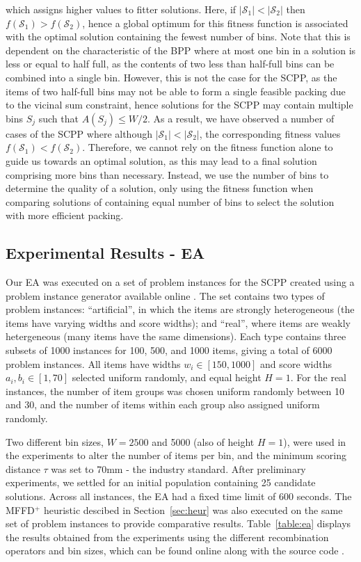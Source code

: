 \documentclass[authoryear]{elsarticle}
\begin{document}
\noindent which assigns higher values to fitter solutions. Here, if $|\mathcal{S}_1| < |\mathcal{S}_2|$  then $f(\mathcal{S}_1) > f(\mathcal{S}_2)$, hence a global optimum for this fitness function is associated with the optimal solution containing the fewest number of bins. Note that this is dependent on the characteristic of the BPP where at most one bin in a solution is less or equal to half full, as the contents of two less than half-full bins can be combined into a single bin. However, this is not the case for the SCPP, as the items of two half-full bins may not be able to form a single feasible packing due to the vicinal sum constraint, hence solutions for the SCPP may contain multiple bins $S_j$ such that $A(S_j) \leq W/2$. As a result, we have observed a number of cases of the SCPP where although  $|\mathcal{S}_1| < |\mathcal{S}_2|$, the corresponding fitness values $f(\mathcal{S}_1) < f(\mathcal{S}_2)$. Therefore, we cannot rely on the fitness function alone to guide us towards an optimal solution, as this may lead to a final solution comprising more bins than necessary. Instead, we use the number of bins to determine the quality of a solution, only using the fitness function when comparing solutions of containing equal number of bins to select the solution with more efficient packing.


\subsection{Experimental Results - EA}
\label{sub:expea}
\noindent Our EA was executed on a set of problem instances for the SCPP created using a problem instance generator available online \citep{hawa2019inst}. The set contains two types of problem instances: ``artificial'', in which the items are strongly heterogeneous (the items have varying widths and score widths); and ``real'', where items are weakly hetergeneous (many items have the same dimensions). Each type contains three subsets of 1000 instances for 100, 500, and 1000 items, giving a total of 6000 problem instances. All items have widths $w_i \in [150,1000]$ and score widths $a_i, b_i \in [1,70]$ selected uniform randomly, and equal height $H=1$. For the real instances, the number of item groups was chosen uniform randomly between 10 and 30, and the number of items within each group also assigned uniform randomly.

Two different bin sizes, $W = 2500$ and 5000 (also of height $H=1$), were used in the experiments to alter the number of items per bin, and the minimum scoring distance $\tau$ was set to 70mm - the industry standard. After preliminary experiments, we settled for an initial population containing 25 candidate solutions. Across all instances, the EA had a fixed time limit of 600 seconds. The MFFD$^+$ heuristic descibed in Section~\ref{sec:heur} was also executed on the same set of problem instances to provide comparative results. Table~\ref{table:ea} displays the results obtained from the experiments using the different recombination operators and bin sizes, which can be found online along with the source code \citep{hawa2019ea}.
\end{document}
